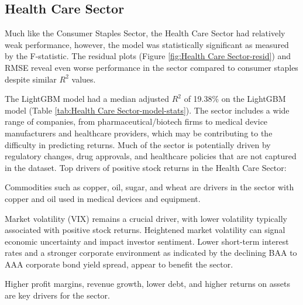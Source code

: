 \documentclass[12pt,a4paper,english]{article}
\begin{document}
\subsection{Health Care Sector}
\label{sec:health}

Much like the Consumer Staples Sector, the Health Care Sector had relatively weak performance, however, the model was statistically significant as measured by the F-statistic. The residual plots (Figure \ref{fig:Health Care Sector-resid}) and RMSE reveal even worse performance in the sector compared to consumer staples despite similar $R^2$ values.

The LightGBM model had a median adjusted $R^2$ of 19.38\% on the LightGBM model (Table \ref{tab:Health Care Sector-model-stats}). The sector includes a wide range of companies, from pharmaceutical/biotech firms to medical device manufacturers and healthcare providers, which may be contributing to the difficulty in predicting returns. Much of the sector is potentially driven by regulatory changes, drug approvals, and healthcare policies that are not captured in the dataset. Top drivers of positive stock returns in the Health Care Sector:


Commodities such as copper, oil, sugar, and wheat are drivers in the sector with copper and oil used in medical devices and equipment.

Market volatility (VIX) remains a crucial driver, with lower volatility typically associated with positive stock returns. Heightened market volatility can signal economic uncertainty and impact investor sentiment. Lower short-term interest rates and a stronger corporate environment as indicated by the declining BAA to AAA corporate bond yield spread, appear to benefit the sector.

Higher profit margins, revenue growth, lower debt, and higher returns on assets are key drivers for the sector.
\end{document}
